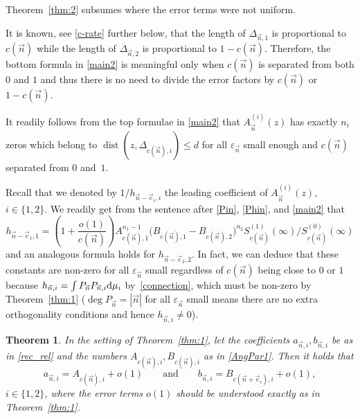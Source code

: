 \documentclass[pdftex]{sigma}
\numberwithin{equation}{section}
\newtheorem{Theorem}{Theorem}[section]
\newcommand{\dist}{\operatorname{dist}}
\newcommand{\n}{{\vec n}}
\begin{document}
Theorem~\ref{thm:2} subsumes \cite[Theorem~3.3]{ApDenYa21} where the error terms were not uniform.

\begin{Remark}
It is known, see \eqref{c-rate} further below, that the length of $ \Delta_{\n,1} $ is proportional to~$ c(\n) $ while the length of $ \Delta_{\n,2} $ is proportional to $ 1 - c(\n) $. Therefore, the bottom formula in \eqref{main2} is meaningful only when $ c(\n) $ is separated from both $ 0 $ and $ 1 $ and thus there is no need to divide the error factors by $ c(\n) $ or $ 1- c(\n) $.
\end{Remark}

\begin{Remark}
It readily follows from the top formulae in \eqref{main2} that $ A_\n^{(i)}(z) $ has exactly $ n_i $ zeros which belong to $ \dist(z,\Delta_{c(\n),i})\leq d $ for all $ \varepsilon_\n $ small enough and $ c(\n) $ separated from $ 0 $ and~$ 1 $.
\end{Remark}

\begin{Remark}
Recall that we denoted by $ 1/h_{\n-\vec e_i,i} $ the leading coefficient of $ A_\n^{(i)}(z) $, $ i\in\{1,2\} $. We readily get from the sentence after \eqref{Pin}, \eqref{Phin}, and \eqref{main2} that
\[
h_{\n-\vec e_1,1} = \left(1+\frac{o(1)}{c(\n)}\right)A_{c(\n),1}^{n_1-1} \bigl(B_{c(\n),1} - B_{c(\n),2}\bigr)^{n_2} S_{c(\n)}^{(1)}(\infty)/S_{c(\n)}^{(0)}(\infty)
\]
and an analogous formula holds for $ h_{\n-\vec e_2,2} $. In fact, we can deduce that these constants are non-zero for all $ \varepsilon_\n $ small regardless of $ c(\n) $ being close to $ 0 $ or $ 1 $ because $ h_{\n,i}=\int P_\n P_{\n,i}{\rm d}\mu_i $ by~\eqref{connection}, which must be non-zero by Theorem~\ref{thm:1} ($ \deg P_\n = |\n| $ for all $ \varepsilon_\n $ small means there are no extra orthogonality conditions and hence $ h_{\n,i}\neq 0 $).
\end{Remark}

\begin{Theorem}
\label{thm:3}
In the setting of Theorem~{\rm\ref{thm:1}}, let the coefficients $ a_{\n,i},b_{\n,i} $ be as in \eqref{rec_rel} and the numbers $ A_{c(\n),i},B_{c(\n),i} $ as in \eqref{AngPar1}. Then it holds that
\begin{equation}
\label{main3}
a_{\n,i} = A_{c(\n),i} + o(1) \qquad \text{and}\qquad  b_{\n,i} = B_{c(\n+\vec e_i),i} + o(1),
\end{equation}
$ i\in\{1,2\} $, where the error terms $ o(1) $ should be understood exactly as in Theorem~{\rm\ref{thm:1}}.
\end{Theorem}
\end{document}
